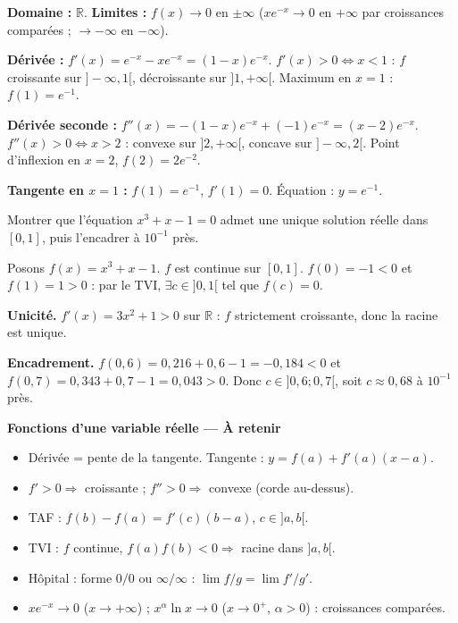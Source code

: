 \documentclass[11pt,a4paper,twoside]{book}
\newcommand{\R}{\mathbb{R}}
\begin{document}
\begin{correctionbox}[Correction]
\textbf{Domaine :} $\R$. \textbf{Limites :} $f(x)\to 0$ en $\pm\infty$ ($xe^{-x}\to 0$ en $+\infty$ par croissances comparées ; $\to -\infty$ en $-\infty$).

\textbf{Dérivée :} $f'(x) = e^{-x} - xe^{-x} = (1-x)e^{-x}$.
$f'(x) > 0 \iff x < 1$ : $f$ croissante sur $]-\infty,1[$, décroissante sur $]1,+\infty[$. Maximum en $x=1$ : $f(1)=e^{-1}$.

\textbf{Dérivée seconde :} $f''(x) = -(1-x)e^{-x} + (-1)e^{-x} = (x-2)e^{-x}$.
$f''(x) > 0 \iff x > 2$ : convexe sur $]2,+\infty[$, concave sur $]-\infty,2[$. Point d'inflexion en $x=2$, $f(2)=2e^{-2}$.

\textbf{Tangente en $x=1$ :} $f(1)=e^{-1}$, $f'(1)=0$. Équation : $y = e^{-1}$.
\end{correctionbox}

\begin{exercicebox}
Montrer que l'équation $x^3 + x - 1 = 0$ admet une unique solution réelle dans $[0,1]$, puis l'encadrer à $10^{-1}$ près.
\end{exercicebox}

\begin{correctionbox}[Correction]
Posons $f(x)=x^3+x-1$. $f$ est continue sur $[0,1]$.
$f(0)=-1 < 0$ et $f(1)=1 > 0$ : par le TVI, $\exists c \in ]0,1[$ tel que $f(c)=0$.

\textbf{Unicité.} $f'(x)=3x^2+1 > 0$ sur $\R$ : $f$ strictement croissante, donc la racine est unique.

\textbf{Encadrement.} $f(0{,}6)=0{,}216+0{,}6-1=-0{,}184 < 0$ et $f(0{,}7)=0{,}343+0{,}7-1=0{,}043 > 0$.
Donc $c \in ]0{,}6 ; 0{,}7[$, soit $c \approx 0{,}68$ à $10^{-1}$ près.
\end{correctionbox}

\begin{retenirbox}
\textbf{Fonctions d'une variable réelle — À retenir}
\begin{itemize}
  \item Dérivée = pente de la tangente. Tangente : $y=f(a)+f'(a)(x-a)$.
  \item $f'>0 \Rightarrow$ croissante ; $f''> 0 \Rightarrow$ convexe (corde au-dessus).
  \item TAF : $f(b)-f(a)=f'(c)(b-a)$, $c \in ]a,b[$.
  \item TVI : $f$ continue, $f(a)f(b)<0 \Rightarrow$ racine dans $]a,b[$.
  \item Hôpital : forme $0/0$ ou $\infty/\infty$ : $\lim f/g = \lim f'/g'$.
  \item $xe^{-x}\to 0$ ($x\to+\infty$) ; $x^\alpha\ln x\to 0$ ($x\to 0^+$, $\alpha>0$) : croissances comparées.
\end{itemize}
\end{retenirbox}
\end{document}
